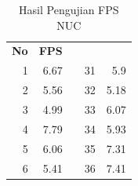 \begin{table}[H]
\centering
  \caption{Hasil Pengujian FPS NUC}
  \label{tb:HasilPengujianFPSNUC}
  \begin{tabular}{|r|r|l|r|r|}
  \cline{1-2} \cline{4-5}
  \multicolumn{1}{|l|}{\cellcolor[HTML]{C0C0C0}\textbf{No}} & \multicolumn{1}{l|}{\cellcolor[HTML]{C0C0C0}\textbf{FPS}} &  & \multicolumn{1}{l|}{\cellcolor[HTML]{C0C0C0}{\color[HTML]{000000} \textbf{No}}} & \multicolumn{1}{l|}{\cellcolor[HTML]{C0C0C0}{\color[HTML]{000000} \textbf{FPS}}} \\ \cline{1-2} \cline{4-5} 
  1                                                         & 6.67                                                      &  & 31                                                                              & 5.9                                                                              \\ \cline{1-2} \cline{4-5} 
  2                                                         & 5.56                                                      &  & 32                                                                              & 5.18                                                                             \\ \cline{1-2} \cline{4-5} 
  3                                                         & 4.99                                                      &  & 33                                                                              & 6.07                                                                             \\ \cline{1-2} \cline{4-5} 
  4                                                         & 7.79                                                      &  & 34                                                                              & 5.93                                                                             \\ \cline{1-2} \cline{4-5} 
  5                                                         & 6.06                                                      &  & 35                                                                              & 7.31                                                                             \\ \cline{1-2} \cline{4-5} 
  6                                                         & 5.41                                                      &  & 36                                                                              & 7.41                                                                             \\ \cline{1-2} \cline{4-5} 

\end{tabular}
\end{table}
